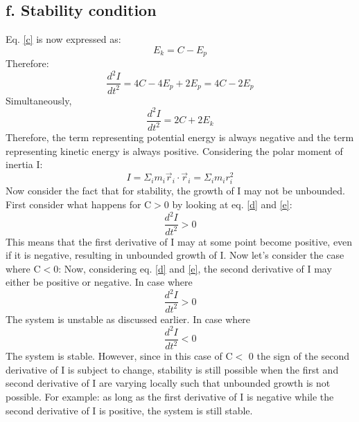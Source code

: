 \subsection{f. Stability condition}
Eq. \ref{c} is now expressed as:
\begin{equation}
E_k = C - E_p
\end{equation}
Therefore:
\begin{equation}
\frac{d^2I}{dt^2} = 4C - 4E_p + 2E_p = 4C - 2E_p
\label{d}
\end{equation}
Simultaneously,
\begin{equation}
\frac{d^2I}{dt^2} = 2C + 2E_k
\label{e}
\end{equation}
Therefore, the term representing potential energy is always negative and the term representing kinetic energy is always positive.
Considering the polar moment of inertia I:
\begin{equation}
I = \Sigma_i m_i \vec{r}_i \cdot \vec{r}_i = \Sigma_i m_i r_i^2
\end{equation}
Now consider the fact that for stability, the growth of I may not be unbounded. First consider what happens for C$>$0 by looking at eq. \ref{d} and \ref{e}:
\begin{equation}
\frac{d^2I}{dt^2} > 0
\end{equation}
This means that the first derivative of I may at some point become positive, even if it is negative, resulting in unbounded growth of I.
Now let's consider the case where C$<$0: Now, considering eq. \ref{d} and \ref{e}, the second derivative of I may either be positive or negative.
In case where
\begin{equation}
\frac{d^2I}{dt^2} > 0
\end{equation}
The system is unstable as discussed earlier.
In case where
\begin{equation}
\frac{d^2I}{dt^2} < 0
\end{equation}
The system is stable. However, since in this case of C$<$ 0 the sign of the second derivative of I is subject to change, stability is still possible when the first and second derivative of I are varying locally such that unbounded growth is not possible. For example: as long as the first derivative of I is negative while the second derivative of I is positive, the system is still stable.
